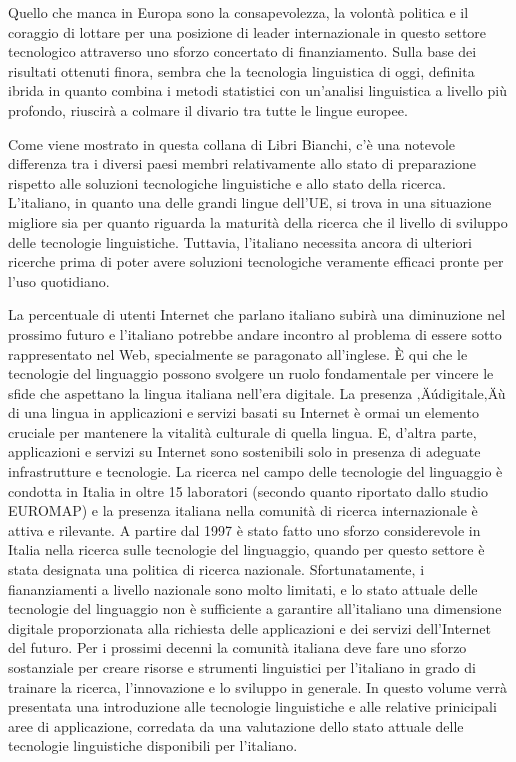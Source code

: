 \begin{multicols}{2}
Quello che manca in Europa sono la consapevolezza, la volont\`{a} politica e il coraggio di lottare per una posizione di leader internazionale in questo settore tecnologico attraverso uno sforzo concertato di finanziamento.  Sulla base dei risultati ottenuti finora, sembra che la tecnologia linguistica di oggi, definita ibrida in quanto combina i metodi statistici con un'analisi linguistica a livello pi\`{u} profondo, riuscir\`{a} a colmare il divario tra tutte le lingue europee.

Come viene mostrato in questa collana di Libri Bianchi, c'\`{e} una notevole differenza tra i diversi paesi membri relativamente allo stato di preparazione rispetto alle soluzioni tecnologiche linguistiche e allo stato della ricerca. L'italiano, in quanto una delle grandi lingue dell'UE, si trova in una situazione migliore sia per quanto riguarda la maturit\`{a} della ricerca che il livello di sviluppo delle tecnologie linguistiche. Tuttavia, l'italiano necessita ancora di ulteriori ricerche prima di poter avere soluzioni tecnologiche veramente efficaci pronte per l'uso quotidiano.

La percentuale di utenti Internet che parlano italiano subir\`{a} una diminuzione nel prossimo futuro e l'italiano potrebbe andare incontro al problema di essere sotto rappresentato nel Web, specialmente se paragonato all'inglese. \`{E} qui che le tecnologie del linguaggio possono svolgere un ruolo fondamentale per vincere le sfide che aspettano la lingua italiana nell'era digitale.  La presenza ‚Äúdigitale‚Äù di una lingua in applicazioni e servizi basati su Internet \`{e} ormai un elemento cruciale per mantenere la vitalit\`{a} culturale di quella lingua. E, d'altra parte, applicazioni e servizi su Internet sono sostenibili solo in presenza di adeguate infrastrutture e tecnologie.  La ricerca nel campo delle tecnologie del linguaggio \`{e} condotta in Italia in oltre 15 laboratori (secondo quanto riportato dallo studio EUROMAP) e la presenza italiana nella comunit\`{a} di ricerca internazionale \`{e} attiva e rilevante.  A partire dal 1997 \`{e} stato fatto uno sforzo considerevole in Italia nella ricerca sulle tecnologie del linguaggio, quando per questo settore \`{e} stata designata una politica di ricerca nazionale. Sfortunatamente, i fiananziamenti a livello nazionale sono molto limitati, e lo stato attuale delle tecnologie del linguaggio non \`{e} sufficiente a garantire all'italiano una dimensione digitale proporzionata alla richiesta delle applicazioni e dei servizi dell'Internet del futuro.  Per i prossimi decenni la comunit\`{a} italiana deve fare uno sforzo sostanziale per creare risorse e strumenti linguistici per l'italiano in grado di trainare la ricerca, l'innovazione e lo sviluppo in generale.  In questo volume verr\`{a} presentata una introduzione alle tecnologie linguistiche e alle relative prinicipali aree di applicazione, corredata da una valutazione dello stato attuale delle tecnologie linguistiche disponibili per l'italiano.


\end{multicols}
